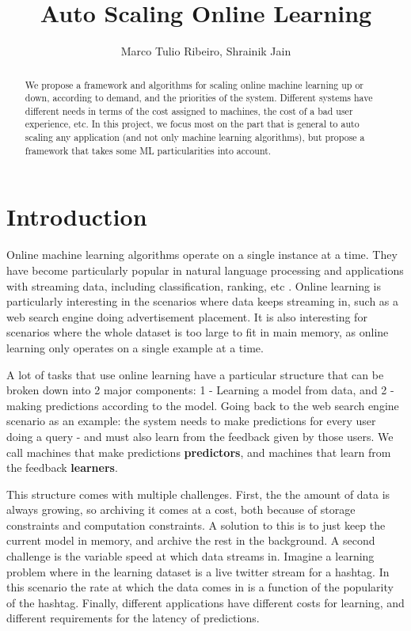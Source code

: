 \documentclass[12pt]{article}
\begin{document}
\title{Auto Scaling Online Learning}
\author{Marco Tulio Ribeiro, Shrainik Jain}
\renewcommand{\today}{Mar 17, 2014}
\maketitle

\begin{abstract}
We propose a framework and algorithms for scaling online machine learning up
or down, according to demand, and the priorities of the system. Different
systems have different needs in terms of the cost assigned to machines, the cost
of a bad user experience, etc. In this project, we focus most on the part that
is general to auto scaling any application (and not only machine learning
algorithms), but propose a framework that takes some ML particularities into
account.
\end{abstract}


\section{Introduction}
Online machine learning algorithms operate on a single instance at a time. They
have become particularly popular in natural language processing and applications
with streaming data, including classification, ranking, etc
\cite{Bordes:2005:HSE:2130928.2130979,
Carvalho:2006:SOL:1150402.1150466, Dredze:2008:CLC:1390156.1390190}. Online
learning is particularly interesting in the scenarios where data keeps streaming
in, such as a web search engine doing advertisement placement. It is also
interesting for scenarios where the whole dataset is too large to fit in main
memory, as online learning only operates on a single example at a time.

A lot of tasks that use online learning have a particular structure that can be 
broken down into 2 major components: 1 - Learning a model from data, and 2 -
making predictions according to the model. Going back to the web search engine
scenario as an example: the system needs to make predictions for every user
doing a query - and must also learn from the feedback given by those users. We
call machines that make predictions \textbf{predictors}, and machines that learn
from the feedback \textbf{learners}.

This structure comes with multiple challenges. First, the 
the amount of data is always growing, so archiving it comes at a cost, both
because of storage constraints and computation constraints. A solution to this
is to just keep the current model in memory, and archive the rest in the
background. A second challenge is the
variable speed at which data streams in. Imagine a learning problem where in the
learning dataset is a live twitter stream for a hashtag. In this scenario the
rate at which the data comes in is a function of the popularity of the hashtag.
Finally, different applications have different costs for learning, and different
requirements for the latency of predictions.
\end{document}
